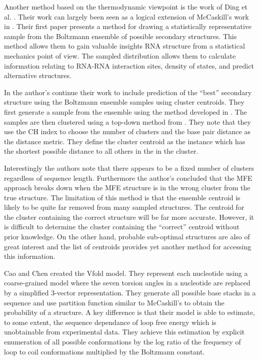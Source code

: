 \documentclass[journal]{IEEEtran}
\begin{document}
Another method based on the thermodynamic viewpoint is the work of Ding et al. \cite{ding2003statistical, ding2005rna}. Their work can largely been seen as a logical extension of McCaskill's work in \cite{mccaskill1990equilibrium}. Their first paper \cite{ding2003statistical} presents a method for drawing a statistically representative sample from the Boltzmann ensemble of possible secondary structures. This method allows them to gain valuable insights RNA structure from a statistical mechanics point of view. The sampled distribution allows them to calculate information relating to RNA-RNA interaction sites, density of states, and predict alternative structures.

In \cite{ding2005rna} the author's continue their work to include prediction of the ``best'' secondary structure using the Boltzmann ensemble samples using cluster centroids. They first generate a sample from the ensemble using the method developed in \cite{ding2003statistical}. The samples are then clustered using a top-down method from \cite{rousseeuw1990finding}. They note that they use the CH index to choose the number of clusters and the base pair distance as the distance metric. They define the cluster centroid as the instance which has the shortest possible distance to all others in the in the cluster.

Interestingly the authors note that there appears to be a fixed number of clusters regardless of sequence length. Furthermore the author's concluded that the MFE approach breaks down when the MFE structure is in the wrong cluster from the true structure. The limitation of this method is that the ensemble centroid is likely to be quite far removed from many sampled structures. The centroid for the cluster containing the correct structure will be far more accurate. However, it is difficult to determine the cluster containing the ``correct'' centroid without prior knowledge. On the other hand, probable sub-optimal structures are also of great interest and the list of centroids provides yet another method for accessing this information.

Cao and Chen \cite{cao2005predicting} created the Vfold model. They represent each nucleotide using a coarse-grained model where the seven torsion angles in a nucleotide are replaced by a simplified 3-vector representation. They generate all possible base stacks in a sequence and use partition function similar to McCaskill's to obtain the probability of a structure. A key difference is that their model is able to estimate, to some extent, the sequence dependance of loop free energy which is unobtainable from experimental data. They achieve this estimation by explicit enumeration of all possible conformations by the log ratio of the frequency of loop to coil conformations multiplied by the Boltzmann constant.
\end{document}
